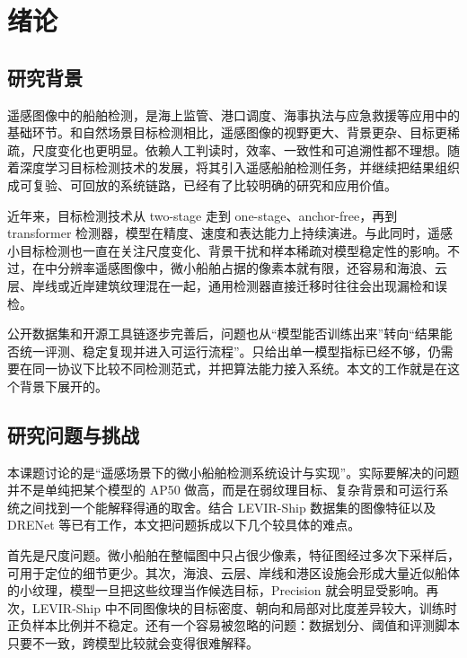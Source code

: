 \section{绪论}\label{sec:introduction}

\subsection{研究背景}

遥感图像中的船舶检测，是海上监管、港口调度、海事执法与应急救援等应用中的基础环节。和自然场景目标检测相比，遥感图像的视野更大、背景更杂、目标更稀疏，尺度变化也更明显。依赖人工判读时，效率、一致性和可追溯性都不理想。随着深度学习目标检测技术的发展，将其引入遥感船舶检测任务，并继续把结果组织成可复验、可回放的系统链路，已经有了比较明确的研究和应用价值。

近年来，目标检测技术从 two-stage 走到 one-stage、anchor-free，再到 transformer 检测器，模型在精度、速度和表达能力上持续演进\cite{ren2015_fasterrcnn,lin2017_fpn,lin2017_focalloss,tian2019_fcos,redmon2016_yolo,carion2020_detr,zhu2021_deformabledetr}。与此同时，遥感小目标检测也一直在关注尺度变化、背景干扰和样本稀疏对模型稳定性的影响\cite{wang2023_sod_review,zhao2024_shipsurvey}。不过，在中分辨率遥感图像中，微小船舶占据的像素本就有限，还容易和海浪、云层、岸线或近岸建筑纹理混在一起，通用检测器直接迁移时往往会出现漏检和误检。

公开数据集和开源工具链逐步完善后，问题也从“模型能否训练出来”转向“结果能否统一评测、稳定复现并进入可运行流程”。只给出单一模型指标已经不够，仍需要在同一协议下比较不同检测范式，并把算法能力接入系统。本文的工作就是在这个背景下展开的。

\subsection{研究问题与挑战}

本课题讨论的是“遥感场景下的微小船舶检测系统设计与实现”。实际要解决的问题并不是单纯把某个模型的 AP50 做高，而是在弱纹理目标、复杂背景和可运行系统之间找到一个能解释得通的取舍。结合 LEVIR-Ship 数据集的图像特征以及 DRENet 等已有工作\cite{chen2022_tinyship_drenet}，本文把问题拆成以下几个较具体的难点。

首先是尺度问题。微小船舶在整幅图中只占很少像素，特征图经过多次下采样后，可用于定位的细节更少。其次，海浪、云层、岸线和港区设施会形成大量近似船体的小纹理，模型一旦把这些纹理当作候选目标，Precision 就会明显受影响。再次，LEVIR-Ship 中不同图像块的目标密度、朝向和局部对比度差异较大，训练时正负样本比例并不稳定。还有一个容易被忽略的问题：数据划分、阈值和评测脚本只要不一致，跨模型比较就会变得很难解释。

